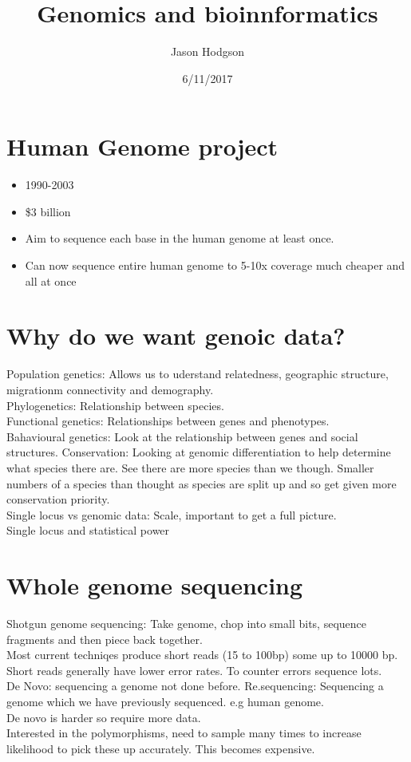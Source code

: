 \documentclass[11pt]{article}
\title{Genomics and bioinnformatics}
\author{Jason Hodgson}
\date{6/11/2017}
\begin{document}
\maketitle
\section{Human Genome project}
\begin{itemize}
\item 1990-2003
\item \$3 billion
\item Aim to sequence each base in the human genome at least once.
\item Can now sequence entire human genome to 5-10x coverage much cheaper and all at once
\end{itemize}
\section{Why do we want genoic data?}
Population genetics: Allows us to uderstand relatedness, geographic structure, migrationm connectivity and demography. \\
Phylogenetics: Relationship between species. \\
Functional genetics: Relationships between genes and phenotypes. \\
Bahavioural genetics: Look at the relationship between genes and social structures. 
Conservation: Looking at genomic differentiation to help determine what species there are. See there are more species than we though. Smaller numbers of a species than thought as species are split up and so get given more conservation priority. \\
Single locus vs genomic data: Scale, important to get a full picture. \\
Single locus and statistical power
\section{Whole genome sequencing}
Shotgun genome sequencing: Take genome, chop into small bits, sequence fragments and then piece back together. \\
Most current techniqes  produce short reads (15 to 100bp) some up to 10000 bp. Short reads generally have lower error rates. To counter errors sequence lots.\\
De Novo: sequencing a genome not done before.
Re.sequencing: Sequencing a genome which we have previously sequenced. e.g human genome. \\
De novo is harder so require more data. \\
Interested in the polymorphisms, need to sample many times to increase likelihood to pick these up accurately. This becomes expensive. \\
\end{document}
